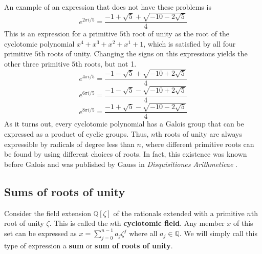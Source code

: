\documentclass{article}
\begin{document}
    An example of an expression that does not have these problems is
$$ e^{2 \pi i/5} = \frac{-1 + \sqrt{5} + \sqrt{-10 - 2 \sqrt{5}}}{4} $$
    This is an expression for a primitive $ 5 $th root of unity as the root of the cyclotomic polynomial $ x^4 + x^3 + x^2 + x^1 + 1 $, which is satisfied by all four primitive $ 5 $th roots of unity. Changing the signs on this expressions yields the other three primitive $ 5 $th roots, but not 1.
$$ e^{4 \pi i/5} = \frac{-1 - \sqrt{5} + \sqrt{-10 + 2 \sqrt{5}}}{4} $$
$$ e^{6 \pi i/5} = \frac{-1 - \sqrt{5} - \sqrt{-10 + 2 \sqrt{5}}}{4} $$
$$ e^{8 \pi i/5} = \frac{-1 + \sqrt{5} - \sqrt{-10 - 2 \sqrt{5}}}{4} $$
    As it turns out, every cyclotomic polynomial has a Galois group that can be expressed as a product of cyclic groups. Thus, $ n $th roots of unity are always expressible by radicals of degree less than $ n $, where different primitive roots can be found by using different choices of roots. In fact, this existence was known before Galois and was published by Gauss in \textit{Disquisitiones Arithmeticae} \cite{gauss}.\\
    \subsection{Sums of roots of unity}
        Consider the field extension $ \mathbb{Q}[\zeta] $ of the rationals extended with a primitive $ n $th root of unity $ \zeta $. This is called the $ n $th \textbf{cyclotomic field}. Any member $ x $ of this set can be expressed as $ x = \sum_{j = 0}^{n - 1} a_j \zeta^j $ where all $ a_j \in \mathbb{Q} $. We will simply call this type of expression a \textbf{sum} or \textbf{sum of roots of unity}.\\
\end{document}
